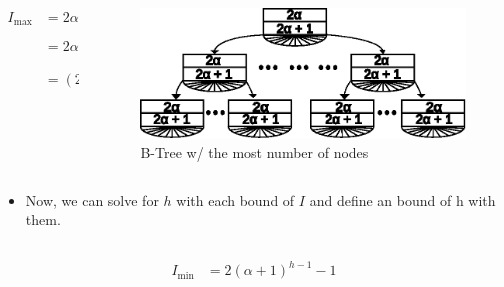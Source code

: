 \documentclass{beamer}
\begin{document}
\begin{frame}
    \begin{columns}
        \begin{column}{0.5\textwidth}
            \begin{block}{}
                \vspace{-0.75cm}
                \[
                    \begin{aligned}
                        I_{\text{max}} &= 2\alpha\left(N_{\text{max}}\left(T\right)\right) \\
                        &= 2\alpha \left(\frac{\left(2\alpha + 1\right)^h - 1}{2\alpha}\right) \\
                        &= \left(2\alpha + 1\right)^h - 1
                    \end{aligned}
                \]
            \end{block}
        \end{column}
        \begin{column}{0.5\textwidth}
            \begin{figure}
                \includegraphics[width=0.95\linewidth,keepaspectratio]{resources/made/generic_max_btree.eps}
                \caption[]{B-Tree w/ the most number of nodes}
            \end{figure}
        \end{column}
    \end{columns}
    \begin{itemize}
        \item Now, we can solve for \(h\) with each bound of \(I\) and define an bound of h with them.
    \end{itemize}
    \begin{columns}
        \begin{column}{0.5\textwidth}
            \begin{block}{}
                \[
                    \begin{aligned}
                        I_{\text{min}} &= 2\left(\alpha + 1\right)^{h - 1} - 1 \\

\end{aligned}\]
\end{block}
\end{column}
\end{columns}
\end{frame}
\end{document}
